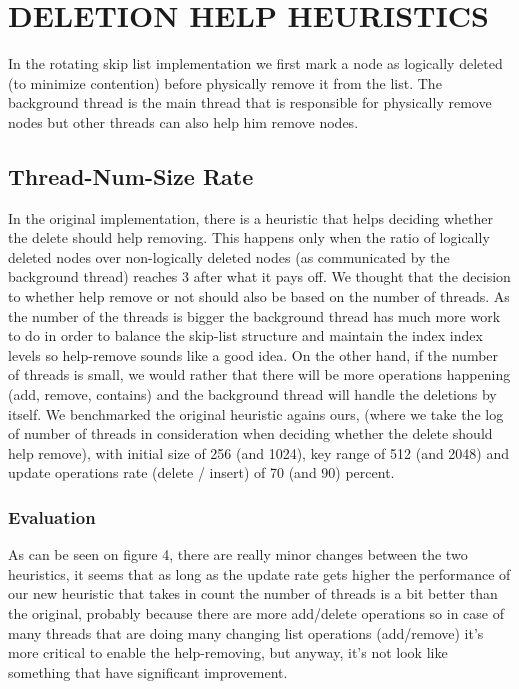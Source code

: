 \documentclass{article}
\begin{document}
\section{DELETION HELP HEURISTICS}
\label{sec:dhh}

In the rotating skip list implementation we first mark a node as logically deleted (to minimize contention) before physically remove it from the list. The background thread is the main thread that is responsible for physically remove nodes but other threads can also help him remove nodes. 

\subsection{Thread-Num-Size Rate}
\label{ssec:tns}

In the original implementation, there is a heuristic that helps deciding whether the delete should help removing. This happens only when the ratio of logically deleted nodes over non-logically deleted nodes (as communicated by the background thread) reaches 3 after what it pays off. We thought that the decision to whether help remove or not should also be based on the number of threads. As the number of the threads is bigger the background thread has much more work to do in order to balance the skip-list structure and maintain the index index levels so help-remove sounds like a good idea. On the other hand, if the number of threads is small, we would rather that there will be more operations happening (add, remove, contains) and the background thread will handle the deletions by itself.
We benchmarked the original heuristic agains ours, (where we take the log of number of threads in consideration when deciding whether the delete should help remove), with initial size of 256 (and 1024), key range of 512 (and 2048) and update operations rate (delete / insert) of 70 (and 90) percent. 

\subsubsection{Evaluation}
\label{sssec:tns-evl}

As can be seen on figure 4, there are really minor changes between the two heuristics, it seems that as long as the update rate gets higher the performance of our new heuristic that takes in count the number of threads is a bit better than the original, probably because there are more add/delete operations so in case of many threads that are doing many changing list operations (add/remove) it's more critical to enable the help-removing, but anyway, it's not look like something that have significant improvement.
\end{document}
